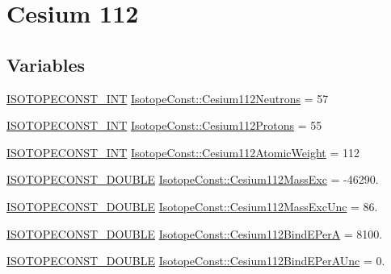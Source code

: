 \hypertarget{group___isotope_const-_cesium-_cs112}{}\section{Cesium 112}
\label{group___isotope_const-_cesium-_cs112}
\subsection*{Variables}
\begin{DoxyCompactItemize}
\item 
\mbox{\hyperlink{group___isotope_const-_macros_ga5f18360b3e99483a35c32d789e62621c}{I\+S\+O\+T\+O\+P\+E\+C\+O\+N\+S\+T\+\_\+\+I\+NT}} \mbox{\hyperlink{group___isotope_const-_cesium-_cs112_gad310de4b2b19d51036c8fd495f933396}{Isotope\+Const\+::\+Cesium112\+Neutrons}} = 57
\item 
\mbox{\hyperlink{group___isotope_const-_macros_ga5f18360b3e99483a35c32d789e62621c}{I\+S\+O\+T\+O\+P\+E\+C\+O\+N\+S\+T\+\_\+\+I\+NT}} \mbox{\hyperlink{group___isotope_const-_cesium-_cs112_ga7e70565da74e39e1eafb561b64145789}{Isotope\+Const\+::\+Cesium112\+Protons}} = 55
\item 
\mbox{\hyperlink{group___isotope_const-_macros_ga5f18360b3e99483a35c32d789e62621c}{I\+S\+O\+T\+O\+P\+E\+C\+O\+N\+S\+T\+\_\+\+I\+NT}} \mbox{\hyperlink{group___isotope_const-_cesium-_cs112_gad3b99585539d2e70f6165ae2596e6362}{Isotope\+Const\+::\+Cesium112\+Atomic\+Weight}} = 112
\item 
\mbox{\hyperlink{group___isotope_const-_macros_ga8f45a7272ce02c0b4c65c44636ed719a}{I\+S\+O\+T\+O\+P\+E\+C\+O\+N\+S\+T\+\_\+\+D\+O\+U\+B\+LE}} \mbox{\hyperlink{group___isotope_const-_cesium-_cs112_gac83193266b2a7c5e9fb60151b70dfad1}{Isotope\+Const\+::\+Cesium112\+Mass\+Exc}} = -\/46290.
\item 
\mbox{\hyperlink{group___isotope_const-_macros_ga8f45a7272ce02c0b4c65c44636ed719a}{I\+S\+O\+T\+O\+P\+E\+C\+O\+N\+S\+T\+\_\+\+D\+O\+U\+B\+LE}} \mbox{\hyperlink{group___isotope_const-_cesium-_cs112_ga19c51cb2c7f5e7ab574cbf259c30208f}{Isotope\+Const\+::\+Cesium112\+Mass\+Exc\+Unc}} = 86.
\item 
\mbox{\hyperlink{group___isotope_const-_macros_ga8f45a7272ce02c0b4c65c44636ed719a}{I\+S\+O\+T\+O\+P\+E\+C\+O\+N\+S\+T\+\_\+\+D\+O\+U\+B\+LE}} \mbox{\hyperlink{group___isotope_const-_cesium-_cs112_ga80dde8cb85f1804aa29d3517d3a96b76}{Isotope\+Const\+::\+Cesium112\+Bind\+E\+PerA}} = 8100.
\item 
\mbox{\hyperlink{group___isotope_const-_macros_ga8f45a7272ce02c0b4c65c44636ed719a}{I\+S\+O\+T\+O\+P\+E\+C\+O\+N\+S\+T\+\_\+\+D\+O\+U\+B\+LE}} \mbox{\hyperlink{group___isotope_const-_cesium-_cs112_ga5c387ac9d9d3d6533cfea192651cb169}{Isotope\+Const\+::\+Cesium112\+Bind\+E\+Per\+A\+Unc}} = 0.

\end{DoxyCompactItemize}
